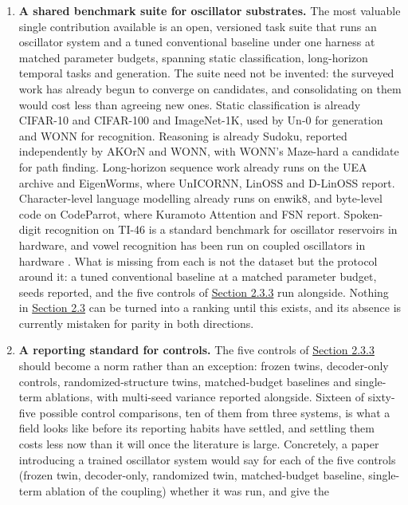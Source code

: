 \documentclass[a4paper,fleqn]{cas-sc}
\providecommand{\tightlist}{%
  \setlength{\itemsep}{0pt}\setlength{\parskip}{0pt}}
\begin{document}
\begin{enumerate}
\def\labelenumi{\arabic{enumi}.}
\tightlist
\item
  \textbf{A shared benchmark suite for oscillator substrates.} The most
  valuable single contribution available is an open, versioned task
  suite that runs an oscillator system and a tuned conventional baseline
  under one harness at matched parameter budgets, spanning static
  classification, long-horizon temporal tasks and generation. The suite
  need not be invented: the surveyed work has already begun to converge
  on candidates, and consolidating on them would cost less than agreeing
  new ones. Static classification is already CIFAR-10 and CIFAR-100 and
  ImageNet-1K, used by Un-0 for generation and WONN for recognition.
  Reasoning is already Sudoku, reported independently by AKOrN and WONN,
  with WONN's Maze-hard a candidate for path finding. Long-horizon
  sequence work already runs on the UEA archive and EigenWorms, where
  UnICORNN, LinOSS and D-LinOSS report. Character-level language
  modelling already runs on enwik8, and byte-level code on CodeParrot,
  where Kuramoto Attention and FSN report. Spoken-digit recognition on
  TI-46 is a standard benchmark for oscillator reservoirs in hardware,
  and vowel recognition has been run on coupled oscillators in hardware
  \citep{romera2018}. What is missing from each is not the dataset but
  the protocol around it: a tuned conventional baseline at a matched
  parameter budget, seeds reported, and the five controls of
  \hyperref[sec-2-3-3]{Section 2.3.3} run alongside. Nothing in
  \hyperref[sec-2-3]{Section 2.3} can be turned into a ranking until
  this exists, and its absence is currently mistaken for parity in both
  directions.
\item
  \textbf{A reporting standard for controls.} The five controls of
  \hyperref[sec-2-3-3]{Section 2.3.3} should become a norm rather than
  an exception: frozen twins, decoder-only controls,
  randomized-structure twins, matched-budget baselines and single-term
  ablations, with multi-seed variance reported alongside. Sixteen of
  sixty-five possible control comparisons, ten of them from three
  systems, is what a field looks like before its reporting habits have
  settled, and settling them costs less now than it will once the
  literature is large. Concretely, a paper introducing a trained
  oscillator system would say for each of the five controls (frozen
  twin, decoder-only, randomized twin, matched-budget baseline,
  single-term ablation of the coupling) whether it was run, and give the

\end{enumerate}
\end{document}

